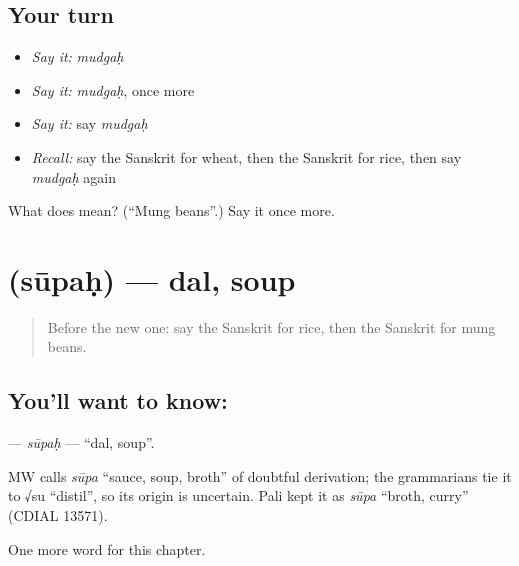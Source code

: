 \subsection*{Your turn}
\begin{itemize}
\raggedright
  \item \emph{Say it:} \emph{mudgaḥ}
  \item \emph{Say it:} \emph{mudgaḥ}, once more
  \item \emph{Say it:} say \emph{mudgaḥ}
  \item \emph{Recall:} say the Sanskrit for wheat, then the Sanskrit for rice, then say \emph{mudgaḥ} again
\end{itemize}

\begin{tcolorbox}[breakable,colback=teal!4,colframe=teal!35!black,title={Before you move on}]
What does  mean? (\textquotedblleft{}Mung beans\textquotedblright{}.) Say it once more.
\end{tcolorbox}
\section[\texorpdfstring{\sk{सूपः} (sūpaḥ)}{सूपः (sūpaḥ)}]{ (sūpaḥ) — dal, soup}

\label{lesson:SA-C106-supah}



\begin{quote}
Before the new one: say the Sanskrit for rice, then the Sanskrit for mung beans.
\end{quote}

\subsection*{You'll want to know: }
\textbf{} — \emph{sūpaḥ} — \textquotedblleft{}dal, soup\textquotedblright{}.

\begin{cousinweb}
MW calls \emph{sūpa} \textquotedblleft{}sauce, soup, broth\textquotedblright{} of doubtful derivation; the grammarians tie it to √su \textquotedblleft{}distil\textquotedblright{}, so its origin is uncertain. Pali kept it as \emph{sūpa} \textquotedblleft{}broth, curry\textquotedblright{} (CDIAL 13571).
\end{cousinweb}

\begin{grammarlens}[title={What you've built}]
One more word for this chapter.
\end{grammarlens}

